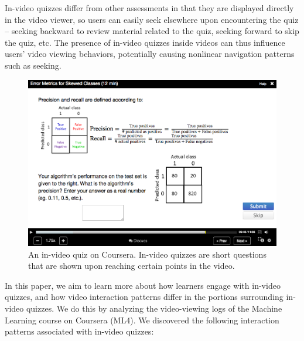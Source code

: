 \documentclass{sigchi}
\begin{document}


In-video quizzes differ from other assessments in that they are displayed directly in the video viewer, so users can easily seek elsewhere upon encountering the quiz -- seeking backward to review material related to the quiz, seeking forward to skip the quiz, etc.
The presence of in-video quizzes inside videos can thus influence users' video viewing behaviors, potentially causing nonlinear navigation patterns such as seeking. %

\begin{figure}
\includegraphics[width=1.0\columnwidth]{coursera}
\caption{An in-video quiz on Coursera. In-video quizzes are short questions that are shown upon reaching certain points in the video.}
\label{fig:coursera}
\end{figure}

In this paper, we aim to learn more about how learners engage with in-video quizzes, and how video interaction patterns differ in the portions surrounding in-video quizzes. We do this by analyzing the video-viewing logs of the Machine Learning course on Coursera (ML4). We discovered the following interaction patterns associated with in-video quizzes:
\end{document}
